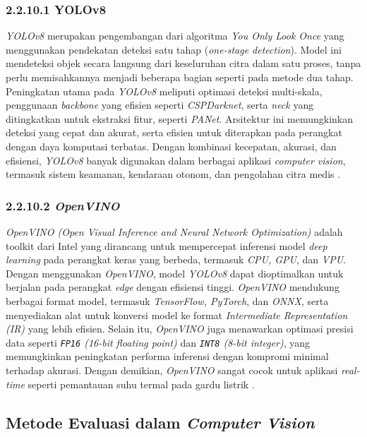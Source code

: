 \subsubsection{2.2.10.1 YOLOv8}
\emph{YOLOv8} merupakan pengembangan dari algoritma \emph{You Only Look Once} yang menggunakan pendekatan deteksi satu tahap (\emph{one-stage detection}). Model ini mendeteksi objek secara langsung dari keseluruhan citra dalam satu proses, tanpa perlu memisahkannya menjadi beberapa bagian seperti pada metode dua tahap. Peningkatan utama pada \emph{YOLOv8} meliputi optimasi deteksi multi-skala, penggunaan \emph{backbone} yang efisien seperti \emph{CSPDarknet}, serta \emph{neck} yang ditingkatkan untuk ekstraksi fitur, seperti \emph{PANet}. Arsitektur ini memungkinkan deteksi yang cepat dan akurat, serta efisien untuk diterapkan pada perangkat dengan daya komputasi terbatas.  Dengan kombinasi kecepatan, akurasi, dan efisiensi, \emph{YOLOv8} banyak digunakan dalam berbagai aplikasi \emph{computer vision}, termasuk sistem keamanan, kendaraan otonom, dan pengolahan citra medis \cite{yolov8}.


\subsubsection{2.2.10.2 \emph{OpenVINO}}
\emph{OpenVINO (Open Visual Inference and Neural Network Optimization)} adalah toolkit dari Intel yang dirancang untuk mempercepat inferensi model \emph{deep learning} pada perangkat keras yang berbeda, termasuk \emph{CPU, GPU}, dan \emph{VPU}. Dengan menggunakan \emph{OpenVINO}, model \emph{YOLOv8} dapat dioptimalkan untuk berjalan pada perangkat \emph{edge} dengan efisiensi tinggi. \emph{OpenVINO} mendukung berbagai format model, termasuk \emph{TensorFlow, PyTorch}, dan \emph{ONNX}, serta menyediakan alat untuk konversi model ke format \emph{Intermediate Representation (IR)} yang lebih efisien. Selain itu, \emph{OpenVINO} juga menawarkan optimasi presisi data seperti \emph {\texttt{FP16} (16-bit floating point)} dan \emph{\texttt{INT8} (8-bit integer)}, yang memungkinkan peningkatan performa inferensi dengan kompromi minimal terhadap akurasi. Dengan demikian, \emph{OpenVINO} sangat cocok untuk aplikasi \emph{real-time} seperti pemantauan suhu termal pada gardu listrik \cite{openvino2021toolkit}.

\subsection{Metode Evaluasi dalam \emph{Computer Vision}}

